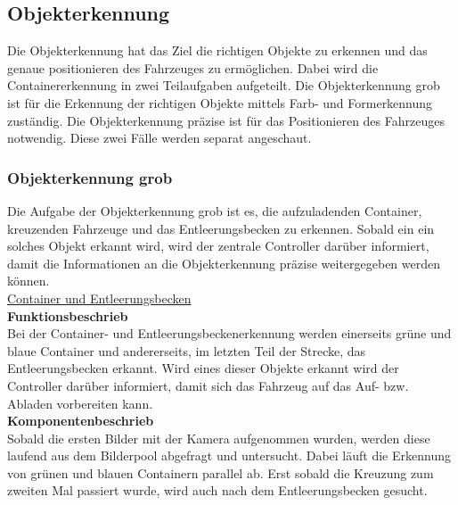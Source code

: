 \subsection{Objekterkennung}
Die Objekterkennung hat das Ziel die richtigen Objekte zu erkennen und das genaue positionieren des Fahrzeuges zu ermöglichen. Dabei wird die Containererkennung in zwei Teilaufgaben aufgeteilt. Die Objekterkennung grob ist für die Erkennung der richtigen Objekte mittels Farb- und Formerkennung zuständig. Die Objekterkennung präzise ist für das Positionieren des Fahrzeuges notwendig. Diese zwei Fälle werden separat angeschaut.\\

\subsubsection{Objekterkennung grob}
Die Aufgabe der Objekterkennung grob ist es, die aufzuladenden Container, kreuzenden Fahrzeuge und das Entleerungsbecken zu erkennen. Sobald ein ein solches Objekt erkannt wird, wird der zentrale Controller darüber informiert, damit die Informationen an die Objekterkennung präzise weitergegeben werden können.
\\[0.2cm]
\underline{Container und Entleerungsbecken}
\\[0.2cm]
\textbf{Funktionsbeschrieb}\\
Bei der Container- und Entleerungsbeckenerkennung werden einerseits grüne und blaue Container und andererseits, im letzten Teil der Strecke, das Entleerungsbecken erkannt. Wird eines dieser Objekte erkannt wird der Controller darüber informiert, damit sich das Fahrzeug auf das Auf- bzw. Abladen vorbereiten kann.
\\[0.2cm]
\textbf{Komponentenbeschrieb}\\
Sobald die ersten Bilder mit der Kamera aufgenommen wurden, werden diese laufend aus dem Bilderpool abgefragt und untersucht. Dabei läuft die Erkennung von grünen und blauen Containern parallel ab. Erst sobald die Kreuzung zum zweiten Mal passiert wurde, wird auch nach dem Entleerungsbecken gesucht.
